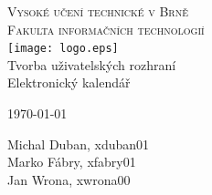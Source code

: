 \begin{titlepage}
\begin{center}
\textsc{{\Huge Vysoké učení technické v Brně}\\
\medskip
{\huge Fakulta informačních technologií}}\\
\vfill
\texttt{[image: logo.eps]}~\\
\vfill
{\LARGE Tvorba uživatelských rozhraní}\\
\medskip
{\Huge Elektronický kalendář}\\
\end{center}
\vfill
\begin{minipage}{0.5\textwidth}
\begin{flushleft}
{\Large \today}
\end{flushleft}
\end{minipage}
\begin{minipage}{0.5\textwidth}
\begin{flushright}
{\Large
Michal Duban, xduban01\\
Marko Fábry, xfabry01\\
\medskip
Jan Wrona, xwrona00
}
\end{flushright}
\end{minipage}
\end{titlepage}
